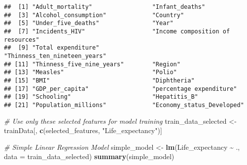 \documentclass[
]{article}
\newenvironment{Shaded}{\begin{snugshade}}{\end{snugshade}}
\newcommand{\AttributeTok}[1]{\textcolor[rgb]{0.13,0.29,0.53}{#1}}
\newcommand{\CommentTok}[1]{\textcolor[rgb]{0.56,0.35,0.01}{\textit{#1}}}
\newcommand{\FunctionTok}[1]{\textcolor[rgb]{0.13,0.29,0.53}{\textbf{#1}}}
\newcommand{\NormalTok}[1]{#1}
\newcommand{\OtherTok}[1]{\textcolor[rgb]{0.56,0.35,0.01}{#1}}
\newcommand{\SpecialCharTok}[1]{\textcolor[rgb]{0.81,0.36,0.00}{\textbf{#1}}}
\newcommand{\StringTok}[1]{\textcolor[rgb]{0.31,0.60,0.02}{#1}}
\begin{document}
\begin{verbatim}
##  [1] "Adult_mortality"                 "Infant_deaths"                  
##  [3] "Alcohol_consumption"             "Country"                        
##  [5] "Under_five_deaths"               "Year"                           
##  [7] "Incidents_HIV"                   "Income composition of resources"
##  [9] "Total expenditure"               "Thinness_ten_nineteen_years"    
## [11] "Thinness_five_nine_years"        "Region"                         
## [13] "Measles"                         "Polio"                          
## [15] "BMI"                             "Diphtheria"                     
## [17] "GDP_per_capita"                  "percentage expenditure"         
## [19] "Schooling"                       "Hepatitis_B"                    
## [21] "Population_millions"             "Economy_status_Developed"
\end{verbatim}

\begin{Shaded}
\begin{Highlighting}[]
\CommentTok{\# Use only these selected features for model training}
\NormalTok{train\_data\_selected }\OtherTok{\textless{}{-}}\NormalTok{ trainData[, }\FunctionTok{c}\NormalTok{(selected\_features, }\StringTok{"Life\_expectancy"}\NormalTok{)]}

\CommentTok{\# Simple Linear Regression Model}
\NormalTok{simple\_model }\OtherTok{\textless{}{-}} \FunctionTok{lm}\NormalTok{(Life\_expectancy }\SpecialCharTok{\textasciitilde{}}\NormalTok{ ., }\AttributeTok{data =}\NormalTok{ train\_data\_selected)}
\FunctionTok{summary}\NormalTok{(simple\_model)}
\end{Highlighting}
\end{Shaded}
\end{document}
